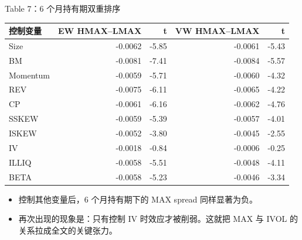 \documentclass[aspectratio=169,10pt]{beamer}
\newcommand{\tinytab}{\tiny\setlength{\tabcolsep}{2.2pt}\renewcommand{\arraystretch}{1.08}}
\begin{document}
\begin{frame}{Table 7：6 个月持有期双重排序}
	\tinytab
	\begin{tabular}{lrrrr}
		\toprule
		控制变量 & EW HMAX--LMAX & t & VW HMAX--LMAX & t\\
		\midrule
		Size & -0.0062 & -5.85 & -0.0061 & -5.43\\
		BM & -0.0081 & -7.41 & -0.0084 & -5.57\\
		Momentum & -0.0059 & -5.71 & -0.0060 & -4.32\\
		REV & -0.0075 & -6.11 & -0.0065 & -4.22\\
		CP & -0.0061 & -6.16 & -0.0062 & -4.76\\
		SSKEW & -0.0059 & -5.39 & -0.0057 & -4.01\\
		ISKEW & -0.0052 & -3.80 & -0.0045 & -2.55\\
		IV & -0.0018 & -0.84 & -0.0006 & -0.25\\
		ILLIQ & -0.0058 & -5.51 & -0.0048 & -4.11\\
		BETA & -0.0058 & -5.23 & -0.0046 & -3.34\\
		\bottomrule
	\end{tabular}
	\vspace{4pt}
	\begin{itemize}
		\item 控制其他变量后，6 个月持有期下的 MAX spread 同样显著为负。
		\item 再次出现的现象是：只有控制 IV 时效应才被削弱。这就把 MAX 与 IVOL 的关系拉成全文的关键张力。
	\end{itemize}
\end{frame}
\end{document}
